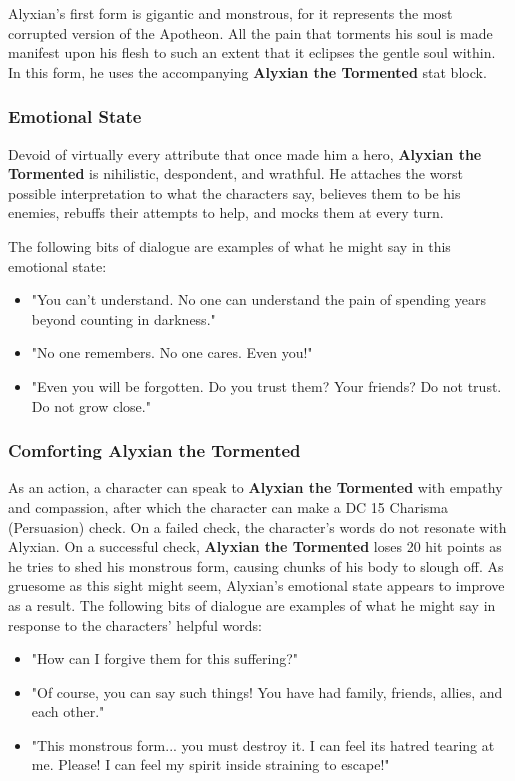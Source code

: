 \documentclass[letterpaper, 11pt, bg=full, twocolumn]{dndbook}
\begin{document}
Alyxian's first form is gigantic and monstrous, for it represents the most corrupted version of the Apotheon. All the pain that torments his soul is made manifest upon his flesh to such an extent that it eclipses the gentle soul within. In this form, he uses the accompanying \textbf{Alyxian the Tormented} stat block.


\subsubsection{Emotional State}

Devoid of virtually every attribute that once made him a hero, \textbf{Alyxian the Tormented} is nihilistic, despondent, and wrathful. He attaches the worst possible interpretation to what the characters say, believes them to be his enemies, rebuffs their attempts to help, and mocks them at every turn.

The following bits of dialogue are examples of what he might say in this emotional state:

\begin{itemize}
\item "You can't understand. No one can understand the pain of spending years beyond counting in darkness."
\item "No one remembers. No one cares. Even you!"
\item "Even you will be forgotten. Do you trust them? Your friends? Do not trust. Do not grow close."
\end{itemize}

\subsubsection{Comforting Alyxian the Tormented}

As an action, a character can speak to \textbf{Alyxian the Tormented} with empathy and compassion, after which the character can make a DC 15 Charisma (Persuasion) check. On a failed check, the character's words do not resonate with Alyxian. On a successful check, \textbf{Alyxian the Tormented} loses 20 hit points as he tries to shed his monstrous form, causing chunks of his body to slough off. As gruesome as this sight might seem, Alyxian's emotional state appears to improve as a result. The following bits of dialogue are examples of what he might say in response to the characters' helpful words:

\begin{itemize}
\item "How can I forgive them for this suffering?"
\item "Of course, you can say such things! You have had family, friends, allies, and each other."
\item "This monstrous form... you must destroy it. I can feel its hatred tearing at me. Please! I can feel my spirit inside straining to escape!"
\end{itemize}
\end{document}
